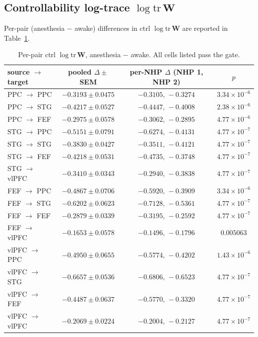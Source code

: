 \subsection*{Controllability log-trace $\log\mathrm{tr}\,\mathbf{W}$}\label{supp:interareal-control-tab-ctrl-W}

Per-pair (anesthesia $-$ awake) differences in ctrl $\log\mathrm{tr}\,\mathbf{W}$ are reported in Table~\ref{tab:supp-interareal-control-ctrl-W}.

\begin{table}[h!]
\centering
\small
\caption[Per-pair ctrl $\log\mathrm{tr}\,\mathbf{W}$]{Per-pair ctrl $\log\mathrm{tr}\,\mathbf{W}$, anesthesia $-$ awake. All cells listed pass the gate.}
\label{tab:supp-interareal-control-ctrl-W}
\begin{tabular}{lccc}
\toprule
source $\to$ target & pooled $\Delta\pm$SEM & per-NHP $\Delta$ (NHP 1, NHP 2) & $p$ \\
\midrule
PPC $\to$ PPC   & $-0.3193\pm 0.0475$ & $-0.3105,\,-0.3274$ & $3.34\!\times\!10^{-6}$ \\
PPC $\to$ STG   & $-0.4217\pm 0.0527$ & $-0.4447,\,-0.4008$ & $2.38\!\times\!10^{-6}$ \\
PPC $\to$ FEF   & $-0.2975\pm 0.0578$ & $-0.3062,\,-0.2895$ & $4.77\!\times\!10^{-6}$ \\
STG $\to$ PPC   & $-0.5151\pm 0.0791$ & $-0.6274,\,-0.4131$ & $4.77\!\times\!10^{-7}$ \\
STG $\to$ STG   & $-0.3830\pm 0.0427$ & $-0.3511,\,-0.4121$ & $4.77\!\times\!10^{-7}$ \\
STG $\to$ FEF   & $-0.4218\pm 0.0531$ & $-0.4735,\,-0.3748$ & $4.77\!\times\!10^{-7}$ \\
STG $\to$ vlPFC & $-0.3410\pm 0.0343$ & $-0.2940,\,-0.3838$ & $4.77\!\times\!10^{-7}$ \\
FEF $\to$ PPC   & $-0.4867\pm 0.0706$ & $-0.5920,\,-0.3909$ & $3.34\!\times\!10^{-6}$ \\
FEF $\to$ STG   & $-0.6202\pm 0.0623$ & $-0.7128,\,-0.5361$ & $4.77\!\times\!10^{-7}$ \\
FEF $\to$ FEF   & $-0.2879\pm 0.0339$ & $-0.3195,\,-0.2592$ & $4.77\!\times\!10^{-7}$ \\
FEF $\to$ vlPFC & $-0.1653\pm 0.0578$ & $-0.1496,\,-0.1796$ & $0.005063$ \\
vlPFC $\to$ PPC & $-0.4950\pm 0.0655$ & $-0.5774,\,-0.4202$ & $1.43\!\times\!10^{-6}$ \\
vlPFC $\to$ STG & $-0.6657\pm 0.0536$ & $-0.6806,\,-0.6523$ & $4.77\!\times\!10^{-7}$ \\
vlPFC $\to$ FEF & $-0.4487\pm 0.0637$ & $-0.5770,\,-0.3320$ & $4.77\!\times\!10^{-7}$ \\
vlPFC $\to$ vlPFC & $-0.2069\pm 0.0224$ & $-0.2004,\,-0.2127$ & $4.77\!\times\!10^{-7}$ \\
\bottomrule
\end{tabular}
\end{table}

